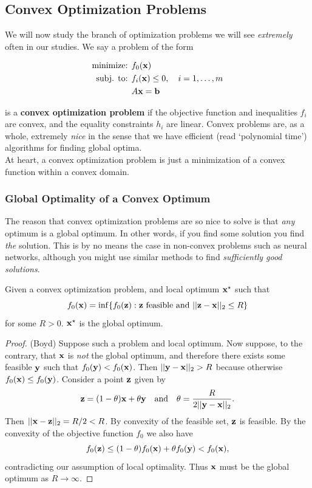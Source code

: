 \documentclass{article}
\begin{document}
\subsection{Convex Optimization Problems}

We will now study the branch of optimization problems we will see
\textit{extremely} often in our studies. We say a problem of the
form

\begin{align*}
    \text{minimize: } & f_0({\bf x})\\
    \text{subj. to: } & f_i({\bf x}) \leq 0, \quad i=1,\dots,m\\
                      & A{\bf x} = {\bf b}
\end{align*}

is a \textbf{convex optimization problem} if the objective function
and inequalities $f_i$ are convex, and the equality constraints
$h_i$ are linear. Convex problems are, as a whole, extremely \textit{nice}
in the sense that we have efficient (read `polynomial time') algorithms
for finding global optima.\\

At heart, a convex optimization problem is 
just a minimization of a convex function within a convex domain.


\subsubsection{Global Optimality of a Convex Optimum}

The reason that convex optimization problems are so nice to solve
is that \textit{any} optimum is a global optimum. In other words,
if you find some solution you find \textit{the} solution. This is
by no means the case in non-convex problems such as neural networks,
although you might use similar methods to find \textit{sufficiently
good solutions}.

\begin{theorem}
    Given a convex optimization problem, and local optimum ${\bf x}^\star$
    such that
    \[
        f_0({\bf x}) = \inf\{f_0({\bf z}) : {\bf z}\text{ feasible and } ||{\bf z}-{\bf x}||_2 \leq R\}
    \]
    for some $R > 0$. ${\bf x}^\star$ is the global optimum.
\end{theorem}
\begin{proof}
    (Boyd)
    Suppose such a problem and local optimum. Now suppose, to the
    contrary, that ${\bf x}$ is \textit{not} the global optimum,
    and therefore there exists some feasible ${\bf y}$ such that $f_0({\bf y})
    < f_0({\bf x})$. Then $||{\bf y}-{\bf x}||_2 >R$ because otherwise $f_0({\bf x})
    \leq f_0({\bf y})$. Consider a point ${\bf z}$ given by
    \[
        {\bf z} = (1-\theta){\bf x}+ \theta{\bf y} \quad\text{and}\quad \theta=\frac{R}{2||{\bf y}-{\bf x}||_2}.
    \]
    Then $||{\bf x}-{\bf z}||_2=R/2 < R$. By convexity of the feasible set,
    ${\bf z}$ is feasible. By the convexity of the objective function $f_0$
    we also have
    \[
        f_0({\bf z}) \leq (1-\theta)f_0({\bf x}) + \theta f_0({\bf y}) < f_0({\bf x}),
    \]
    contradicting our assumption of local optimality. Thus ${\bf x}$
    must be the global optimum as $R\to\infty$.
\end{proof}
\end{document}
